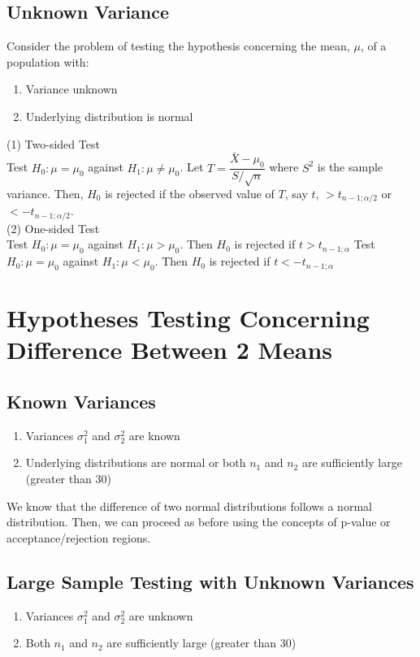 \subsection{Unknown Variance}
Consider the problem of testing the hypothesis concerning the mean, $\mu$, of a population with:
\begin{enumerate}
    \item Variance unknown
    \item Underlying distribution is normal
\end{enumerate}
(1) Two-sided Test \\
 Test $H_0: \mu = \mu_0$ against $H_1: \mu \neq \mu_0$. 
 Let $T = \dfrac{\bar{X} - \mu_0}{S/\sqrt{n}}$ where $S^2$ is the sample variance. Then, $H_0$ is rejected if the observed value of $T$, say $t$, $ > t_{n - 1; \alpha/2}$ or $ < -t_{n - 1; \alpha/2}$. \\
 (2) One-sided Test \\
 Test $H_0: \mu = \mu_0$ against $H_1: \mu > \mu_0$.
 Then $H_0$ is rejected if $t > t_{n - 1; \alpha}$
 Test $H_0: \mu = \mu_0$ against $H_1: \mu < \mu_0$.
  Then $H_0$ is rejected if $t < -t_{n - 1; \alpha}$
\section{Hypotheses Testing Concerning Difference Between 2 Means}
\subsection{Known Variances}
\begin{enumerate}
    \item Variances $\sigma_1^2$ and $\sigma_2^2$ are known
     \item Underlying distributions are normal or both $n_1$ and $n_2$ are sufficiently large (greater than 30)
\end{enumerate}
We know that the difference of two normal distributions follows a normal distribution. Then, we can proceed as before using the concepts of p-value or acceptance/rejection regions.
\subsection{Large Sample Testing with Unknown Variances}
\begin{enumerate}
    \item Variances $\sigma_1^2$ and $\sigma_2^2$ are unknown
     \item Both $n_1$ and $n_2$ are sufficiently large (greater than 30)
\end{enumerate}
